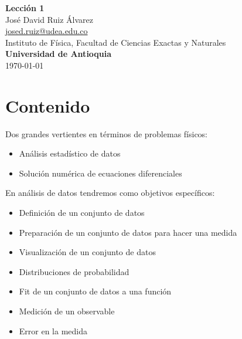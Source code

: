 \documentclass[10.5pt]{article}
\begin{document}
\noindent
\begin{minipage}[b]{0.75\linewidth}
{\LARGE\bf Lecci\'{o}n 1}\\ %
\large{Jos\'{e} David Ruiz \'{A}lvarez} \\
\small{\href{mailto:josed.ruiz@udea.edu.co}{josed.ruiz@udea.edu.co}} \\ %
\normalsize{Instituto de Física, Facultad de Ciencias Exactas y Naturales} \\%
\normalsize{\bf Universidad de Antioquia} \\[8mm]
\today %
\end{minipage}%



\section{Contenido}

Dos grandes vertientes en t\'{e}rminos de problemas f\'{i}sicos: 
\begin{itemize}
\item Análisis estadístico de datos
\item Solución numérica de ecuaciones diferenciales
\end{itemize}

En análisis de datos tendremos como objetivos específicos:
\begin{itemize}
\item Definición de un conjunto de datos 
\item Preparación de un conjunto de datos para hacer una medida
\item Visualización de un conjunto de datos
\item Distribuciones de probabilidad
\item Fit de un conjunto de datos a una función
\item Medición de un observable
\item Error en la medida
\end{itemize}
\end{document}
